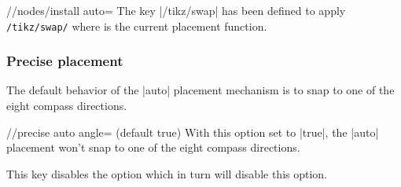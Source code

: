 \begin{multicols}{2}
\begin{key}{/\tikzext/nodes/install auto=}
  The key |/tikz/swap| has been defined to apply \texttt{/tikz/swap/}
  where  is the current placement function.
\end{key}
\subsubsection{Precise placement}
The default behavior of the |auto| placement mechanism is
to snap to one of the eight compass directions.
\begin{key}{/\tikzext/precise auto angle= (default true)}
With this option set to |true|, the |auto| placement won't snap
to one of the eight compass directions.

This key disables the  option
which in turn will disable this option.
\end{key}
\newcolumn
\null
\end{multicols}